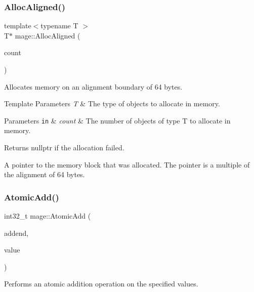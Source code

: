 \subsubsection{\texorpdfstring{Alloc\+Aligned()}{AllocAligned()}\hspace{0.1cm}{\footnotesize\ttfamily [2/2]}}
{\footnotesize\ttfamily template$<$typename T $>$ \\
T$\ast$ mage\+::\+Alloc\+Aligned (\begin{DoxyParamCaption}\item[{size\+\_\+t}]{count }\end{DoxyParamCaption})}

Allocates memory on an alignment boundary of 64 bytes.


\begin{DoxyTemplParams}{Template Parameters}
{\em T} & The type of objects to allocate in memory. \\
\hline
\end{DoxyTemplParams}

\begin{DoxyParams}[1]{Parameters}
\mbox{\tt in}  & {\em count} & The number of objects of type {\ttfamily T} to allocate in memory. \\
\hline
\end{DoxyParams}
\begin{DoxyReturn}{Returns}
{\ttfamily nullptr} if the allocation failed. 

A pointer to the memory block that was allocated. The pointer is a multiple of the alignment of 64 bytes. 
\end{DoxyReturn}
\hypertarget{namespacemage_ad397e742fa7e3532686fd46bb50e8166}{}\label{namespacemage_ad397e742fa7e3532686fd46bb50e8166} 
\subsubsection{\texorpdfstring{Atomic\+Add()}{AtomicAdd()}\hspace{0.1cm}{\footnotesize\ttfamily [1/2]}}
{\footnotesize\ttfamily int32\+\_\+t mage\+::\+Atomic\+Add (\begin{DoxyParamCaption}\item[{Atomic\+Int32 $\ast$}]{addend,  }\item[{int32\+\_\+t}]{value }\end{DoxyParamCaption})}

Performs an atomic addition operation on the specified values.



